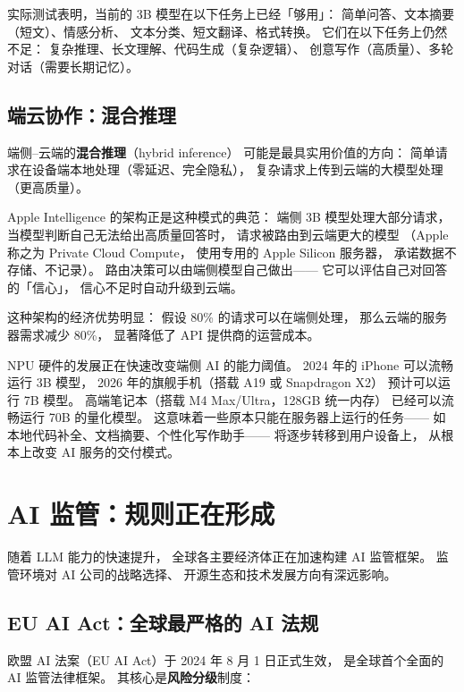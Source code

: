 实际测试表明，当前的 3B 模型在以下任务上已经「够用」：
简单问答、文本摘要（短文）、情感分析、
文本分类、短文翻译、格式转换。
它们在以下任务上仍然不足：
复杂推理、长文理解、代码生成（复杂逻辑）、
创意写作（高质量）、多轮对话（需要长期记忆）。

\subsection{端云协作：混合推理}

端侧--云端的\textbf{混合推理}（hybrid inference）
可能是最具实用价值的方向：
简单请求在设备端本地处理（零延迟、完全隐私），
复杂请求上传到云端的大模型处理（更高质量）。

Apple Intelligence 的架构正是这种模式的典范：
端侧 3B 模型处理大部分请求，
当模型判断自己无法给出高质量回答时，
请求被路由到云端更大的模型
（Apple 称之为 Private Cloud Compute，
使用专用的 Apple Silicon 服务器，
承诺数据不存储、不记录）。
路由决策可以由端侧模型自己做出——
它可以评估自己对回答的「信心」，
信心不足时自动升级到云端。

这种架构的经济优势明显：
假设 80\% 的请求可以在端侧处理，
那么云端的服务器需求减少 80\%，
显著降低了 API 提供商的运营成本。

\begin{corebox}
NPU 硬件的发展正在快速改变端侧 AI 的能力阈值。
2024 年的 iPhone 可以流畅运行 3B 模型，
2026 年的旗舰手机（搭载 A19 或 Snapdragon X2）
预计可以运行 7B 模型。
高端笔记本（搭载 M4 Max/Ultra，128GB 统一内存）
已经可以流畅运行 70B 的量化模型。
这意味着一些原本只能在服务器上运行的任务——
如本地代码补全、文档摘要、个性化写作助手——
将逐步转移到用户设备上，
从根本上改变 AI 服务的交付模式。
\end{corebox}

\section{AI 监管：规则正在形成}
\label{sec:regulation}

随着 LLM 能力的快速提升，
全球各主要经济体正在加速构建 AI 监管框架。
监管环境对 AI 公司的战略选择、
开源生态和技术发展方向有深远影响。

\subsection{EU AI Act：全球最严格的 AI 法规}

欧盟 AI 法案（EU AI Act）于 2024 年 8 月 1 日正式生效，
是全球首个全面的 AI 监管法律框架。
其核心是\textbf{风险分级}制度：


